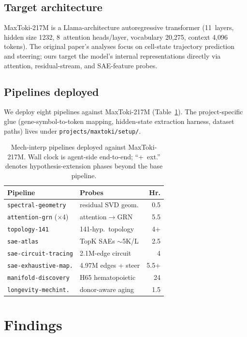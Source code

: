 \documentclass{article}
\newcommand{\maxtoki}{MaxToki-217M\xspace}
\begin{document}
\subsection{Target architecture}

\maxtoki{} is a Llama-architecture autoregressive transformer
(11~layers, hidden size 1232, 8~attention heads/layer, vocabulary
20{,}275, context 4{,}096 tokens). The original paper's analyses
focus on cell-state trajectory prediction and steering; ours target
the model's internal representations directly via attention,
residual-stream, and SAE-feature probes.

\subsection{Pipelines deployed}

We deploy eight pipelines against \maxtoki{}
(Table~\ref{tab:pipelines}). The project-specific glue
(gene-symbol-to-token mapping, hidden-state extraction harness,
dataset paths) lives under \texttt{projects/maxtoki/setup/}.

\begin{table}[t]
\centering
\small
\caption{Mech-interp pipelines deployed against \maxtoki{}. Wall
clock is agent-side end-to-end; \mbox{``+ ext.''} denotes
hypothesis-extension phases beyond the base pipeline.}
\label{tab:pipelines}
\begin{tabular}{@{}llr@{}}
\toprule
Pipeline & Probes & Hr. \\
\midrule
\texttt{spectral-geometry} & residual SVD geom. & 0.5 \\
\texttt{attention-grn} ($\times$4) & attention$\to$GRN & 5.5 \\
\texttt{topology-141} & 141-hyp.\ topology & 4+ \\
\texttt{sae-atlas} & TopK SAEs $\sim$5K/L & 2.5 \\
\texttt{sae-circuit-tracing} & 2.1M-edge circuit & 4 \\
\texttt{sae-exhaustive-map.} & 4.97M edges + steer & 5.5+ \\
\texttt{manifold-discovery} & H65 hematopoietic & 24 \\
\texttt{longevity-mechint.} & donor-aware aging & 1.5 \\
\bottomrule
\end{tabular}
\end{table}

\section{Findings}
\label{sec:findings}
\end{document}
